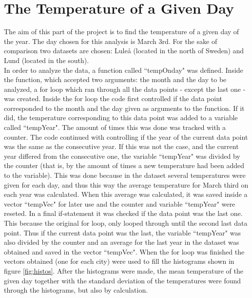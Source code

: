 \documentclass[../main.tex]{subfiles}
\begin{document}
  
\section {The Temperature of a Given Day}

The aim of this part of the project is to find the temperature of a given day of the year. The day chosen for this analysis is March 3rd. For the sake of comparison two datasets are chosen: Luleå (located in the north of Sweden) and Lund (located in the south). \\

\noindent In order to analyze the data, a function called ``tempOnday" was defined. Inside the function, which accepted two arguments: the month and the day to be analyzed, a for loop which ran through all the data points - except the last one - was created. Inside the for loop the code first controlled if the data point corresponded to the month and the day given as 
arguments to the function. If it did, the temperature corresponding to this data point was added to a variable called ``tempYear". The amount of times this was done was tracked with a counter. The code continued with controlling if the year of the current data point was the same as the consecutive year. If this
was not the case, and the current year differed from the consecutive one, the variable ``tempYear" was divided by the counter (that is, by the amount of times a new temperature had been added to the variable). This was done because in the dataset several temperatures were given for each day, and thus this way 
the average temperature for March third on each year was calculated. When this average was calculated, it was saved inside a vector ``tempVec" for later use and the counter and variable ``tempYear" were reseted. In a final if-statement it was checked if the data point was the last one. This because the original for 
loop, only looped through until the second last data point. Thus if the current data point was the last, the variable ``tempYear" was also divided by the counter and an average for the last year in the dataset was obtained and saved in the vector ``tempVec". 
When the for loop was finished the vectors obtained (one for each city) were used to fill the histograms shown in figure \ref{fig:histos}. After the histograms were made, the mean temperature of the given day together with the standard deviation of the temperatures were found through the histograms, but also by calculation. \\
\end{document}
